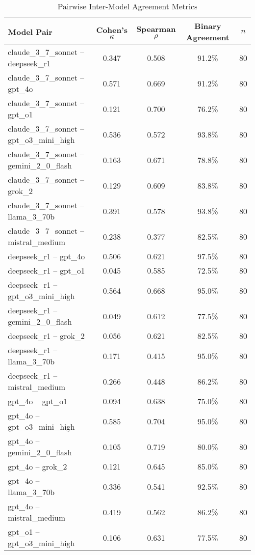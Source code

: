 \documentclass{article}
\begin{document}
\begin{table}[htbp]
\centering
\caption{Pairwise Inter-Model Agreement Metrics}
\label{tab:pairwise_agreement}
\begin{tabular}{lcccc}
\toprule
Model Pair & Cohen's $\kappa$ & Spearman $\rho$ & Binary Agreement & $n$ \\
\midrule
claude\_3\_7\_sonnet -- deepseek\_r1 & 0.347 & 0.508 & 91.2\% & 80 \\
claude\_3\_7\_sonnet -- gpt\_4o & 0.571 & 0.669 & 91.2\% & 80 \\
claude\_3\_7\_sonnet -- gpt\_o1 & 0.121 & 0.700 & 76.2\% & 80 \\
claude\_3\_7\_sonnet -- gpt\_o3\_mini\_high & 0.536 & 0.572 & 93.8\% & 80 \\
claude\_3\_7\_sonnet -- gemini\_2\_0\_flash & 0.163 & 0.671 & 78.8\% & 80 \\
claude\_3\_7\_sonnet -- grok\_2 & 0.129 & 0.609 & 83.8\% & 80 \\
claude\_3\_7\_sonnet -- llama\_3\_70b & 0.391 & 0.578 & 93.8\% & 80 \\
claude\_3\_7\_sonnet -- mistral\_medium & 0.238 & 0.377 & 82.5\% & 80 \\
deepseek\_r1 -- gpt\_4o & 0.506 & 0.621 & 97.5\% & 80 \\
deepseek\_r1 -- gpt\_o1 & 0.045 & 0.585 & 72.5\% & 80 \\
deepseek\_r1 -- gpt\_o3\_mini\_high & 0.564 & 0.668 & 95.0\% & 80 \\
deepseek\_r1 -- gemini\_2\_0\_flash & 0.049 & 0.612 & 77.5\% & 80 \\
deepseek\_r1 -- grok\_2 & 0.056 & 0.621 & 82.5\% & 80 \\
deepseek\_r1 -- llama\_3\_70b & 0.171 & 0.415 & 95.0\% & 80 \\
deepseek\_r1 -- mistral\_medium & 0.266 & 0.448 & 86.2\% & 80 \\
gpt\_4o -- gpt\_o1 & 0.094 & 0.638 & 75.0\% & 80 \\
gpt\_4o -- gpt\_o3\_mini\_high & 0.585 & 0.704 & 95.0\% & 80 \\
gpt\_4o -- gemini\_2\_0\_flash & 0.105 & 0.719 & 80.0\% & 80 \\
gpt\_4o -- grok\_2 & 0.121 & 0.645 & 85.0\% & 80 \\
gpt\_4o -- llama\_3\_70b & 0.336 & 0.541 & 92.5\% & 80 \\
gpt\_4o -- mistral\_medium & 0.419 & 0.562 & 86.2\% & 80 \\
gpt\_o1 -- gpt\_o3\_mini\_high & 0.106 & 0.631 & 77.5\% & 80 \\

\end{tabular}
\end{table}
\end{document}
